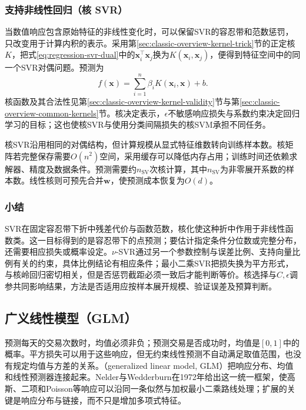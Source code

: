 \subsubsection{支持非线性回归（核 SVR）}
\label{sec:regression-kernel-svr}

当数值响应包含原始特征的非线性变化时，可以保留SVR的容忍带和范数惩罚，只改变用于计算内积的表示。采用第\ref{sec:classic-overview-kernel-trick}节的正定核$K$，把式\eqref{eq:regression-svr-dual}中的$\bm{x}_i^{\top}\bm{x}_j$换为$K(\bm{x}_i,\bm{x}_j)$，便得到特征空间中的同一个SVR对偶问题。预测为
\begin{equation}
  f(\bm{x})=\sum_{i=1}^{n}\beta_i K(\bm{x}_i,\bm{x})+b.
  \label{eq:regression-kernel-svr-prediction}
\end{equation}
核函数及其合法性见第\ref{sec:classic-overview-kernel-validity}节与第\ref{sec:classic-overview-common-kernels}节。核决定表示，$\epsilon$不敏感响应损失与系数约束决定回归学习的目标；这也使核SVR与使用分类间隔损失的核SVM承担不同任务。

核SVR沿用相同的对偶结构，但计算规模从显式特征维数转向训练样本数。核矩阵若完整保存需要$O(n^2)$空间，采用缓存可以降低内存占用；训练时间还依赖求解器、精度及数据条件。预测需要约$n_{\mathrm{SV}}$次核计算，其中$n_{\mathrm{SV}}$为非零展开系数的样本数。线性核则可预先合并$\bm{w}$，使预测成本恢复为$O(d)$。

\subsubsection{小结}

SVR在固定容忍带下折中残差代价与函数范数，核化使这种折中作用于非线性函数类。这一目标得到的是容忍带下的点预测；要估计指定条件分位数或完整分布，还需要相应损失或概率设定。$\nu$-SVR通过另一个参数控制与误差比例、支持向量比例有关的约束，具体比例结论有相应条件；最小二乘SVR把损失换为平方形式，与核岭回归密切相关，但是否惩罚截距必须一致后才能判断等价。核选择与$C,\epsilon$调参共同影响结果，方法是否适用应按样本展开规模、验证误差及预算判断。

\subsection{广义线性模型（GLM）}
\label{sec:regression-glm}

预测每天的交易次数时，均值必须非负；预测交易是否成功时，均值是$[0,1]$中的概率。平方损失可以用于这些响应，但无约束线性预测不自动满足取值范围，也没有规定均值与方差的关系。（generalized linear model, GLM）把响应分布、均值和线性预测器连接起来。Nelder与Wedderburn在1972年给出这一统一框架，使高斯、二项和Poisson等响应可以沿同一条似然与加权最小二乘路线处理；扩展的关键是响应分布与链接，而不只是增加多项式特征。

